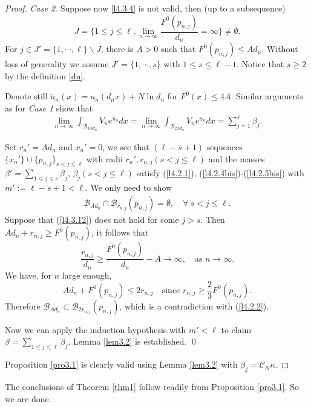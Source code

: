\documentclass[11pt]{amsart}
\numberwithin{equation}{section}
\begin{document}
\begin{proof}
\medskip
{\sl Case 2}. Suppose now \eqref{l4.3.4} is not valid, then (up to a subsequence)
$$J = \Big\{1\le j \le \ell, \lim_{n\rightarrow\infty}\frac{F^{0}(p_{n,j})}{d_{n}}=\infty\Big\} \ne \emptyset.$$
For $j \in J' = \{1,\cdots,\ell\} \backslash J$, there is $A > 0$ such that $F^{0}(p_{n,j})\leq Ad_{n}$. Without loss of generality we assume $J' =\{1,\cdots,s\}$ with $1\leq s\leq \ell-1$. Notice that $s \ge 2$ by the definition \eqref{dn}.

Denote still $\widetilde{u}_{n}(x)=u_{n}(d_{n}x)+N\ln d_{n}$ for $F^{0}(x)\leq4A$. Similar arguments as for {\sl Case 1} show that
\begin{align}\label{l4.3.10}
\lim\limits_{n\rightarrow\infty}\int_{\mathcal{B}_{4Ad_{n}}}V_{n}e^{u_{n}}dx=\lim\limits_{n\rightarrow\infty}\int_{\mathcal{B}_{2Ad_{n}}}V_{n}e^{u_{n}}dx=\sum_{j=1}^s \beta_j.
\end{align}

Set $r_n' =Ad_{n}$ and $x_n'=0$, we see that $(\ell-s+1)$ sequences $\{x_n'\}\cup \{p_{n, j}\}_{s < j \leq \ell}$ with radii $r_n', r_{n, j} (s < j \le \ell)$ and the masses $\beta'=\sum_{1\leq j \leq s} \beta_j$, $\beta_j (s < j \le \ell)$ satisfy
(\ref{l4.2.1}), (\ref{l4.2.4bis})-(\ref{l4.2.5bis}) with $m' := \ell-s+1 < \ell$. We only need to show
\begin{align}\label{l4.3.12}
\mathcal{B}_{Ad_{n}}\cap \mathcal{B}_{r_{n, j}}(p_{n, j})=\emptyset, \quad\forall ~s < j\leq \ell.
\end{align}
Suppose that (\ref{l4.3.12}) does not hold for some $j > s$. Then $Ad_{n}+r_{n, j}\geq F^{0}(p_{n, j})$, it follows that
$$\frac{r_{n, j}}{d_{n}}\geq \frac{F^{0}(p_{n, j})}{d_{n}}-A\rightarrow\infty, \quad\mbox{as } n\rightarrow\infty.$$
We have, for $n$ large enough,
$$Ad_{n}+F^{0}(p_{n, j})\leq 2r_{n, j} \quad \mbox{since } r_{n, j}\geq \frac{2}{3}F^{0}(p_{n, j}).$$
Therefore $\mathcal{B}_{Ad_{n}}\subset \mathcal{B}_{2r_{n, j}}(p_{n, j})$, which is a contradiction with (\ref{l4.2.2}).

Now we can apply the induction hypothesis with $m' < \ell$ to claim $\beta = \sum_{1 \leq j \leq \ell} \beta_j$. Lemma \ref{lem3.2} is established. \qed

\medskip
Proposition \ref{pro3.1} is clearly valid using Lemma \ref{lem3.2} with $\beta_j=\mathcal{C}_N \kappa.$
\end{proof}

The conclusions of Theorem \ref{thm1} follow readily from Proposition \ref{pro3.1}. So we are done.
\end{document}
